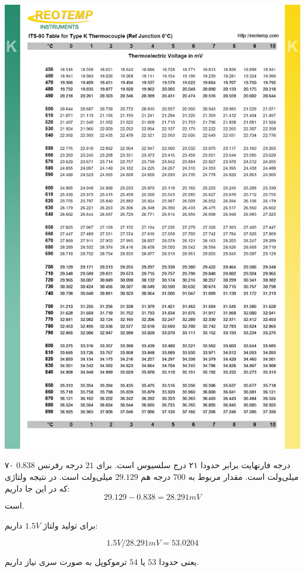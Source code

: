 \documentclass[12pt]{article}
\begin{document}
 
\begin{center}
	\includegraphics[width = 0.5 \textwidth]{images/4.jpg}
\end{center}

۷۰ درجه فارنهایت برابر حدودا ۲۱ درج سلسیوس است. برای $21$ درجه رفرنس $0.838$ میلی‌ولت است.  مقدار مربوط به $700$ درجه هم $29.129$ میلی‌ولت است. در نتیجه ولتاژی که در این جا داریم:
$$29.129 - 0.838 = 28.291 mV$$
است.

برای تولید ولتاژ $1.5V$ داریم:

$$1.5V / 28.291 mV = 53.0204 $$

یعنی حدودا $53$ یا $54$ ترموکوپل به صورت سری نیاز داریم.


 
\end{document}
